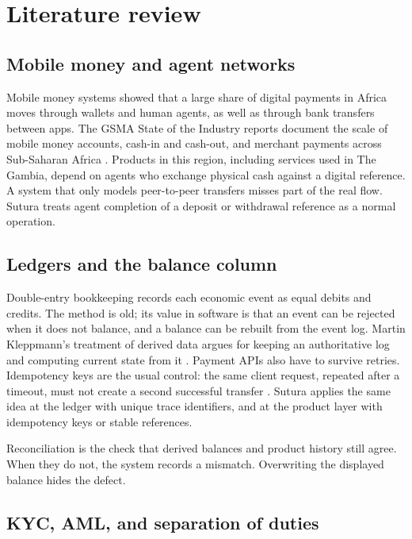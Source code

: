 \documentclass[12pt,a4paper]{article}
\begin{document}
\section{Literature review}

\subsection{Mobile money and agent networks}

Mobile money systems showed that a large share of digital payments in Africa moves through wallets and human agents, as well as through bank transfers between apps. The GSMA State of the Industry reports document the scale of mobile money accounts, cash-in and cash-out, and merchant payments across Sub-Saharan Africa \cite{gsma2024}. Products in this region, including services used in The Gambia, depend on agents who exchange physical cash against a digital reference. A system that only models peer-to-peer transfers misses part of the real flow. Sutura treats agent completion of a deposit or withdrawal reference as a normal operation.

\subsection{Ledgers and the balance column}

Double-entry bookkeeping records each economic event as equal debits and credits. The method is old; its value in software is that an event can be rejected when it does not balance, and a balance can be rebuilt from the event log. Martin Kleppmann's treatment of derived data argues for keeping an authoritative log and computing current state from it \cite{kleppmann2017}. Payment APIs also have to survive retries. Idempotency keys are the usual control: the same client request, repeated after a timeout, must not create a second successful transfer \cite{stripeidem}. Sutura applies the same idea at the ledger with unique trace identifiers, and at the product layer with idempotency keys or stable references.

Reconciliation is the check that derived balances and product history still agree. When they do not, the system records a mismatch. Overwriting the displayed balance hides the defect.

\subsection{KYC, AML, and separation of duties}
\end{document}
